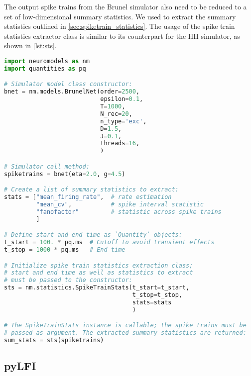 The output spike trains from the Brunel simulator also need to be reduced to a set of low-dimensional summary statistics. We used  to extract the summary statistics outlined in \cref{sec:spiketrain_statistics}. The usage of the spike train statistics extractor class is similar to its counterpart for the HH simulator, as shown in \cref{lst:sts}.
\begin{lstlisting}[language=python, label={lst:sts}, caption={Example usage of the spike train statistics extraction class.}]
import neuromodels as nm
import quantities as pq

# Simulator model class constructor:
bnet = nm.models.BrunelNet(order=2500,
                           epsilon=0.1,
                           T=1000,
                           N_rec=20,
                           n_type='exc',
                           D=1.5,
                           J=0.1,
                           threads=16,
                           )

# Simulator call method:
spiketrains = bnet(eta=2.0, g=4.5)

# Create a list of summary statistics to extract:
stats = ["mean_firing_rate",  # rate estimation
         "mean_cv",           # spike interval statistic
         "fanofactor"         # statistic across spike trains
         ]

# Define start and end time as `Quantity` objects:
t_start = 100. * pq.ms  # Cutoff to avoid transient effects
t_stop = 1000 * pq.ms   # End time

# Initialize spike train statistics extraction class;
# start and end time as well as statistics to extract
# must be passed to the constructor:
sts = nm.statistics.SpikeTrainStats(t_start=t_start,
                                    t_stop=t_stop,
                                    stats=stats
                                    )

# The SpikeTrainStats instance is callable; the spike trains must be
# passed as argument. The extracted summary statistics are returned:
sum_stats = sts(spiketrains)
\end{lstlisting}


\subsection{pyLFI}\label{sec:pylfi}

